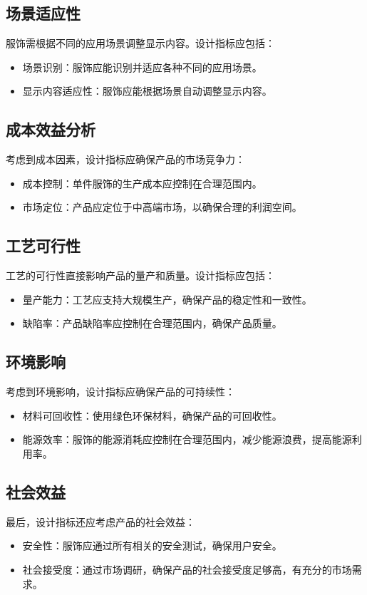 \documentclass[12pt,hyperref,a4paper,UTF8]{ctexart}
\begin{document}
\subsection*{场景适应性}
服饰需根据不同的应用场景调整显示内容。设计指标应包括：
\begin{itemize}
  \item 场景识别：服饰应能识别并适应各种不同的应用场景。
  \item 显示内容适应性：服饰应能根据场景自动调整显示内容。
\end{itemize}

\subsection*{成本效益分析}
考虑到成本因素，设计指标应确保产品的市场竞争力：
\begin{itemize}
  \item 成本控制：单件服饰的生产成本应控制在合理范围内。
  \item 市场定位：产品应定位于中高端市场，以确保合理的利润空间。
\end{itemize}

\subsection*{工艺可行性}
工艺的可行性直接影响产品的量产和质量。设计指标应包括：
\begin{itemize}
  \item 量产能力：工艺应支持大规模生产，确保产品的稳定性和一致性。
  \item 缺陷率：产品缺陷率应控制在合理范围内，确保产品质量。
\end{itemize}

\subsection*{环境影响}
考虑到环境影响，设计指标应确保产品的可持续性：
\begin{itemize}
  \item 材料可回收性：使用绿色环保材料，确保产品的可回收性。
  \item 能源效率：服饰的能源消耗应控制在合理范围内，减少能源浪费，提高能源利用率。
\end{itemize}

\subsection*{社会效益}
最后，设计指标还应考虑产品的社会效益：
\begin{itemize}
  \item 安全性：服饰应通过所有相关的安全测试，确保用户安全。
  \item 社会接受度：通过市场调研，确保产品的社会接受度足够高，有充分的市场需求。
\end{itemize}
\end{document}
